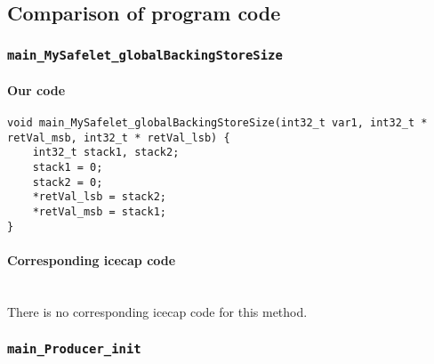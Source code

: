\begin{landscape}
\begin{multicols}{2}
\subsection{Comparison of program code}
\label{PersistentSignal-code-comparison-subsection}

\subsubsection{\texttt{main\_MySafelet\_globalBackingStoreSize}}

\paragraph{Our code}\hfill
\begin{lstlisting}[firstnumber=257]
void main_MySafelet_globalBackingStoreSize(int32_t var1, int32_t * retVal_msb, int32_t * retVal_lsb) {
	int32_t stack1, stack2;
	stack1 = 0;
	stack2 = 0;
	*retVal_lsb = stack2;
	*retVal_msb = stack1;
}
\end{lstlisting}

\paragraph{Corresponding icecap code}\hfill\\
There is no corresponding icecap code for this method.

\subsubsection{\texttt{main\_Producer\_init}}


\end{multicols}
\end{landscape}
